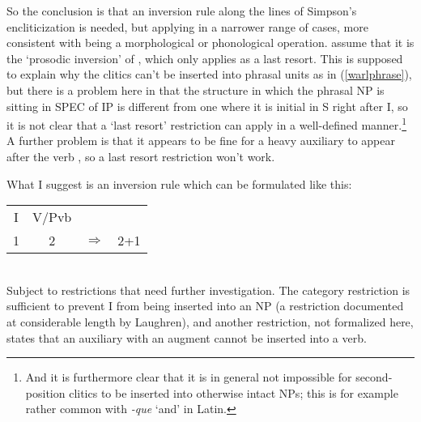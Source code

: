 \documentclass[output=paper,hidelinks]{langscibook}
\begin{document}
So the conclusion is that an inversion rule along the lines of Simpson's
encliticization is needed, but applying in a narrower range of cases, more consistent
with being a morphological or phonological operation.  \citet{AustBres96} assume
that it is the `prosodic inversion' of \citet{Halpern95}, which only applies as
a last resort.  This is supposed to explain why the clitics can't be inserted into
phrasal units as in (\ref{warlphrase}), but there is a problem here in that
the structure in which the phrasal NP is sitting in SPEC of IP is different from one
where it is initial in S right after I, so it is not clear that a `last resort'
restriction can apply in a well-defined manner.\footnote
 {And it is furthermore clear that it is in general not impossible for
 second-position clitics to be inserted into otherwise intact NPs; this
 is for example rather common with {\it -que} `and' in Latin.}
A further problem is that it appears to be fine for a heavy auxiliary to appear
after the verb \citep[97]{Laughren2002}, so a last resort restriction won't work.

What I suggest is an inversion rule which can be formulated like this:
\ea
\begin{tabular}[t]{cccc}
I & V/Pvb\\
1 & 2 & $\Rightarrow$ 
  & 2+1
\end{tabular}\\
Subject to restrictions that need further investigation.
\z
The category restriction is sufficient to prevent I from being inserted
into an NP (a restriction documented at considerable length by Laughren),
and another restriction, not formalized here, states that an auxiliary with an augment cannot be inserted
into a verb.  
\end{document}
